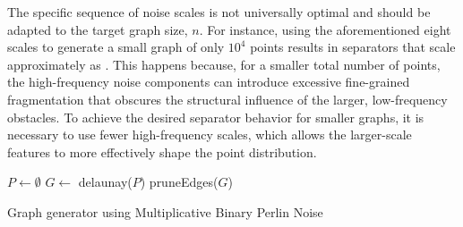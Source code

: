 The specific sequence of noise scales is not universally optimal and should be adapted to the target graph size, \(n\).
For instance, using the aforementioned eight scales to generate a small graph of only \(10^4\) points results in separators that scale approximately as .
This happens because, for a smaller total number of points, the high-frequency noise components can introduce excessive fine-grained fragmentation that obscures the structural influence of the larger, low-frequency obstacles.
To achieve the desired separator behavior for smaller graphs, it is necessary to use fewer high-frequency scales, which allows the larger-scale features to more effectively shape the point distribution.

\begin{algorithm}[tbhp]
	\BlankLine
	\(P \longleftarrow \emptyset\)\;
	\(G \longleftarrow\) delaunay(\(P\))\;
	pruneEdges(\(G\))\;
	\;
	\caption{Graph generator using Multiplicative Binary Perlin Noise}
	\label{alg:fractal_noise_point_sampling}
\end{algorithm}


